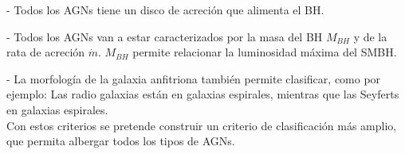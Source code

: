 - Todos los AGNs tiene un disco de acreción que alimenta el BH.

- Todos los AGNs van a estar caracterizados por la masa del BH $M_{BH}$ y de la rata de acreción $\dot{m}$. $M_{BH}$ permite relacionar la luminosidad máxima del SMBH. 

- La morfología de la galaxia anfitriona también permite clasificar, como por ejemplo: Las radio galaxias están en galaxias espirales, mientras que las Seyferts en galaxias espirales.\\

Con estos criterios se pretende construir un criterio de clasificación más amplio, que permita albergar todos los tipos de AGNs.






